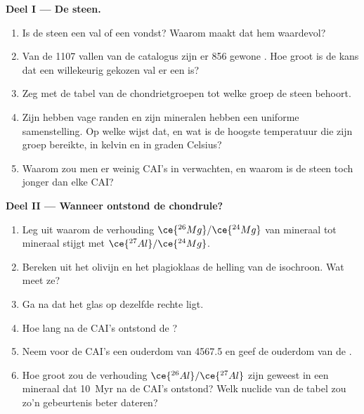 \begin{problem}
\medskip
\noindent\textbf{Deel I --- De steen.}
\begin{enumerate}
  \item Is de steen een val of een vondst? Waarom maakt dat hem waardevol?
  \item Van de \num{1107} vallen van de catalogus zijn er 856 gewone . Hoe groot
        is de kans dat een willekeurig gekozen val er een is?
  \item Zeg met de tabel van de chondrietgroepen tot welke groep de steen behoort.
  \item Zijn  hebben vage randen en zijn mineralen hebben een uniforme
        samenstelling. Op welke  wijst dat, en wat is de
        hoogste temperatuur die zijn groep bereikte, in kelvin en in graden Celsius?
  \item Waarom zou men er weinig CAI's in verwachten, en waarom is de steen toch
        jonger dan elke CAI?
\end{enumerate}

\noindent\textbf{Deel II --- Wanneer ontstond de chondrule?}
\begin{enumerate}[resume]
  \item Leg uit waarom de verhouding $\ce{^{26}Mg}/\ce{^{24}Mg}$ van mineraal tot mineraal
        stijgt met $\ce{^{27}Al}/\ce{^{24}Mg}$.
  \item Bereken uit het olivijn en het plagioklaas de helling van de isochroon.
        Wat meet ze?
  \item Ga na dat het glas op dezelfde rechte ligt.
  \item Hoe lang na de CAI's ontstond de ?
  \item Neem voor de CAI's een ouderdom van \qty{4567.5}{\Ma} en geef de ouderdom van de .
  \item Hoe groot zou de verhouding $\ce{^{26}Al}/\ce{^{27}Al}$ zijn geweest in een mineraal dat
        \qty{10}{Myr} na de CAI's ontstond? Welk nuclide van de tabel zou zo'n
        gebeurtenis beter dateren?
\end{enumerate}


\end{problem}
